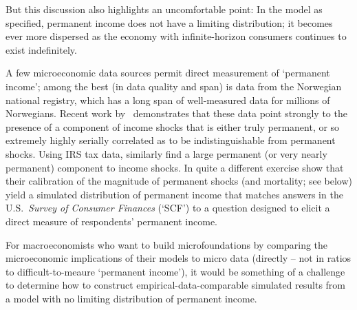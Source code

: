 \documentclass[BufferStockTheory]{subfiles}
\begin{document}
But this discussion also highlights an uncomfortable point: In the model as specified, permanent income does not have a limiting distribution; it becomes ever more dispersed as the economy with infinite-horizon consumers continues to exist indefinitely.

A few microeconomic data sources permit direct measurement of `permanent income'; among the best (in data quality and span) is data from the Norwegian national registry, which has a long span of well-measured data for millions of Norwegians. Recent work by~\cite{crawleyParsimonious} demonstrates that these data point strongly to the presence of a component of income shocks that is either truly permanent, or so extremely highly serially correlated as to be indistinguishable from permanent shocks.  Using IRS tax data, \cite{dhprvInequality} similarly find a large permanent (or very nearly permanent) component to income shocks. In quite a different exercise \cite{cstwMPC} show that their calibration of the magnitude of permanent shocks (and mortality; see below) yield a simulated distribution of permanent income that matches answers in the U.S.\ \emph{Survey of Consumer Finances} (`SCF') to a question designed to elicit a direct measure of respondents' permanent income. %

For macroeconomists who want to build microfoundations by comparing the microeconomic implications of their models to micro data (directly -- not in ratios to difficult-to-meaure `permanent income'), it would be something of a challenge to determine how to construct empirical-data-comparable simulated results from a model with no limiting distribution of permanent income.
\end{document}
